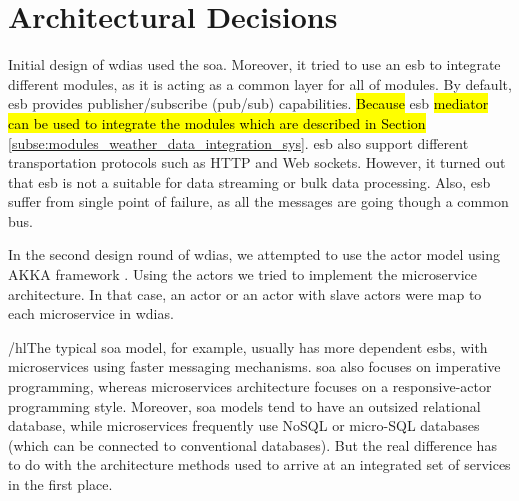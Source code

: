 \section{Architectural Decisions}
\label{se:architectural_decisions}

Initial design of \acrshort{wdias} used the \acrfull{soa}. Moreover, it tried to use an \acrfull{esb} to integrate different modules, as it is acting as a common layer for all of modules. By default, \acrshort{esb} provides publisher/subscribe (pub/sub) capabilities.
\hl{Because} \acrshort{esb} \hl{mediator can be used to integrate the modules which are described in Section} \ref{subse:modules_weather_data_integration_sys}. \acrshort{esb} also support different transportation protocols such as HTTP and Web sockets. However, it turned out that \acrshort{esb} is not a suitable for data streaming or bulk data processing. Also, \acrshort{esb} suffer from single point of failure, as all the messages are going though a common bus.

In the second design round of \acrshort{wdias}, we attempted to use the actor model using AKKA framework \cite{HewittWhyModel}. %
Using the actors we tried to implement the microservice architecture. In that case, an actor or an actor with slave actors were map to each microservice in \acrshort{wdias}.

/hl{The typical \acrshort{soa} model, for example, usually has more dependent \acrshort{esb}s, with microservices using faster messaging mechanisms. \acrshort{soa} also focuses on imperative programming, whereas microservices architecture focuses on a responsive-actor programming style. Moreover, \acrshort{soa} models tend to have an outsized relational database, while microservices frequently use NoSQL or micro-SQL databases (which can be connected to conventional databases). But the real difference has to do with the architecture methods used to arrive at an integrated set of services in the first place.}

